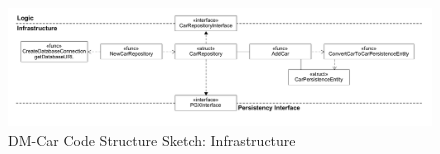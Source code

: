 \begin{figure}[h]
	\centering
	\includegraphics[width=\textwidth]{figures/dm_car_css_infrastructure.png}
	\caption{DM-Car Code Structure Sketch: Infrastructure}
	\label{fig:dm_car_css_infrastructure}
\end{figure}



